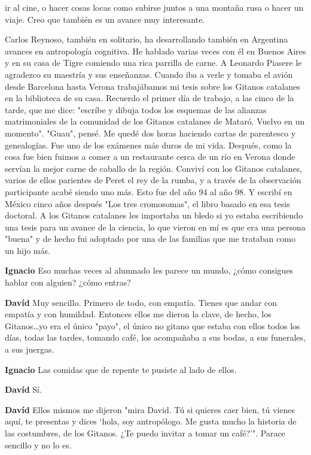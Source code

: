 \documentclass[
  spanish,
  11pt,
  a4paper,
]{scrbook}
\newenvironment{transcripcion}{
    \begin{list}{}{
        \setlength{\leftmargin}{1.5em}  %
        \setlength{\rightmargin}{0em}
        \setlength{\itemsep}{0.2em}     %
        \setlength{\parsep}{0.0em}
        \setlength{\listparindent}{0pt}
    }
}{
    \end{list}
}
\newcommand{\personaje}[1]{\textbf{#1}\quad}
\begin{document}
\begin{transcripcion}
ir al cine, o hacer cosas locas como subirse juntos a una montaña rusa o hacer un viaje. Creo que también es un avance muy interesante.

Carlos Reynoso, también en solitario, ha desarrollando también en Argentina avances en antropología cognitiva. He hablado varias veces con él en Buenos Aires y en su casa de Tigre comiendo una rica parrilla de carne. A Leonardo Piasere le agradezco su maestría y sus enseñanzas. Cuando iba a verle y tomaba el avión desde Barcelona hasta Verona trabajábamos mi tesis sobre los Gitanos catalanes en la biblioteca de su casa. Recuerdo el primer día de trabajo, a las cinco de la tarde, que me dice: "escríbe y dibuja todos los esquemas de las alianzas matrimoniales de la comunidad de los Gitanos catalanes de Mataró. Vuelvo en un momento". "Guau", pensé. Me quedé dos horas haciendo cartas de parentesco y genealogías. Fue uno de los exámenes más duros de mi vida. Después, como la cosa fue bien fuimos a comer a un restaurante cerca de un río en Verona donde servían la mejor carne de caballo de la región. Conviví con los Gitanos catalanes, varios de ellos parientes de Peret el rey de la rumba, y a través de la observación participante acabé siendo uno más. Esto fue del año 94 al año 98. Y escribí en México cinco años después "Los tres cromosomas", el libro basado en esa tesis doctoral. A los Gitanos catalanes les importaba un bledo si yo estaba escribiendo una tesis para un avance de la ciencia, lo que vieron en mí es que era una persona "buena" y de hecho fui adoptado por una de las familias que me trataban como un hijo más.

\item \personaje{Ignacio} Eso muchas veces al alumnado les parece un mundo, ¿cómo consigues hablar con alguien? ¿cómo entras?

\item \personaje{Davíd} Muy sencillo. Primero de todo, con empatía. Tienes que andar con empatía y con humildad. Entonces ellos me dieron la clave, de hecho, los Gitanos\dots yo era el único "payo", el único no gitano que estaba con ellos todos los días, todas las tardes, tomando café, los acompañaba a sus bodas, a sus funerales, a sus juergas.

\item \personaje{Ignacio} Las comidas que de repente te pusiste al lado de ellos.

\item \personaje{Davíd} Sí.

\item \personaje{Davíd} Ellos mismos me dijeron "mira David. Tú si quieres caer bien, tú vienes aquí, te presentas y dices `hola, soy antropólogo. Me gusta mucho la historia de las costumbres, de los Gitanos. ¿Te puedo invitar a tomar un café?'". Parace sencillo y no lo es.


\end{transcripcion}
\end{document}
